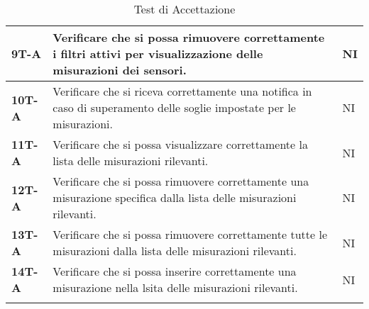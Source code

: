 \begin{longtable}{|>{\raggedright\arraybackslash}m{}|>{\raggedright\arraybackslash}m{}|>{\raggedright\arraybackslash}m{}|}
	\hline
	\textbf{9T-A}   & Verificare che si possa rimuovere correttamente i filtri attivi per visualizzazione delle misurazioni dei sensori. & NI\\
	\hline
	\textbf{10T-A}   & Verificare che si riceva correttamente una notifica in caso di superamento delle soglie impostate per le misurazioni. & NI\\
	\hline
	\textbf{11T-A}   & Verificare che si possa visualizzare correttamente la lista delle misurazioni rilevanti. & NI\\
	\hline
	\textbf{12T-A}   & Verificare che si possa rimuovere correttamente una misurazione specifica dalla lista delle misurazioni rilevanti. & NI\\
	\hline
	\textbf{13T-A}   & Verificare che si possa rimuovere correttamente tutte le misurazioni dalla lista delle misurazioni rilevanti. & NI\\
	\hline
	\textbf{14T-A}   & Verificare che si possa inserire correttamente una misurazione nella lsita delle misurazioni rilevanti. & NI\\
	\hline
	\caption{Test di Accettazione} %
	\label{table:16}
\end{longtable}
